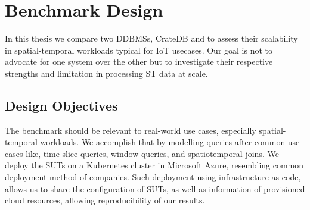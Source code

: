 \section{Benchmark Design}
\label{cha:benchmarkdesign}

%
%
%

In this thesis we compare two DDBMSs, CrateDB and \mobilitydbc to assess their scalability in spatial-temporal workloads typical for IoT usecases. 
Our goal is not to advocate for one system over the other but to investigate their respective strengths and limitation in processing ST data at scale.

\subsection{Design Objectives}
The benchmark should be relevant to real-world use cases, especially spatial-temporal workloads.
We accomplish that by modelling queries after common use cases like, time slice queries, window queries, and spatiotemporal joins.
We deploy the SUTs on a Kubernetes cluster in Microsoft Azure, resembling common deployment method of companies.
Such deployment using infrastructure as code, allows us to share the configuration of SUTs, as well as information of provisioned cloud resources, allowing reproducibility of our results.

